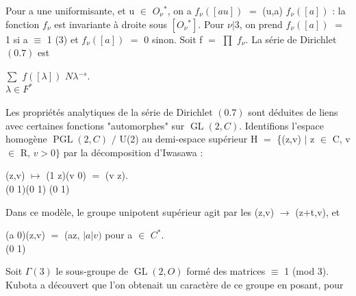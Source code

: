 \documentclass[10pt,a4paper]{article}
\begin{document}
\par Pour a une uniformisante, et u $\in{}$ $O_\nu{}^*$, on a $f_\nu{}([au])$ $=$ (u,a) $f_\nu{}([a])$ : la fonction $f_\nu{}$ est invariante à droite sous $[O_\nu{}^*]$. Pour $\nu{}|3$, on prend $f_\nu{}([a])$ $=$ 1 si a $\equiv{}$ 1 (3) et $f_\nu{}([a])$ $=$ 0 sinon. Soit f $=$ $\prod{}$ $f_\nu{}$. La série de Dirichlet $(0.7)$ est\par
\par\smallskip\begin{center}\begin{minipage}{0.96\textwidth}\centering
$\sum{}$ $f([\lambda{}])$ $N\lambda{}^{-s}$. \\ $\lambda{}\in{}F^*$
\end{minipage}\end{center}\smallskip
\par Les propriétés analytiques de la série de Dirichlet $(0.7)$ sont déduites de liens avec certaines fonctions "automorphes" sur $\operatorname{GL}(2,C)$. Identifions l'espace homogène $\operatorname{PGL}(2,C)$ $/$ U(2) au demi-espace supérieur H $=$ \{(z,v) $|$ z $\in{}$ C, v $\in{}$ R, $v>0\}$ par la décomposition d'Iwasawa :\par
\par\smallskip\begin{center}\begin{minipage}{0.96\textwidth}\centering
(z,v) $\mapsto{}$ (1 z)(v 0) $=$ (v z). \\ (0 1)(0 1) (0 1)
\end{minipage}\end{center}\smallskip
\par Dans ce modèle, le groupe unipotent supérieur agit par les (z,v) $\to{}$ (z+t,v), et\par
\par\smallskip\begin{center}\begin{minipage}{0.96\textwidth}\centering
(a 0)(z,v) $=$ (az, $|a|v)$ pour a $\in{}$ $C^*$. \\ (0 1)
\end{minipage}\end{center}\smallskip
\par Soit $\Gamma{}(3)$ le sous-groupe de $\operatorname{GL}(2,O)$ formé des matrices $\equiv{}$ 1 (mod 3). Kubota a découvert que l'on obtenait un caractère de ce groupe en posant, pour\par
\end{document}
